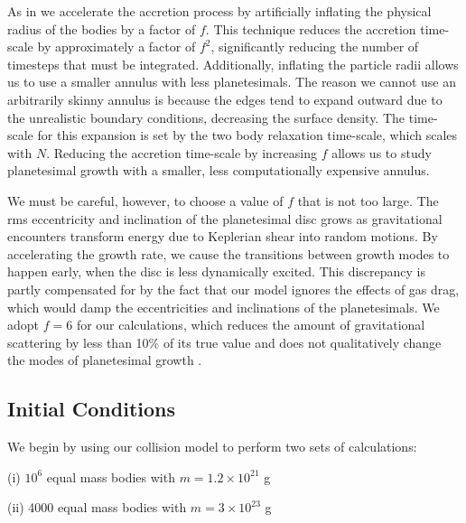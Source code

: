 As in \cite{kokubo96, kokubo98} we accelerate the accretion process by artificially inflating the physical radius of the bodies by 
a factor of $f$. This technique reduces the accretion time-scale by approximately a factor of $f^{2}$, significantly reducing the 
number of timesteps that must be integrated. Additionally, inflating the particle radii allows us to use a smaller annulus with less 
planetesimals. The reason we cannot use an arbitrarily skinny annulus is because the edges tend to expand outward due to the 
unrealistic boundary conditions, decreasing the surface density. The time-scale for this expansion is set by the two body 
relaxation time-scale, which scales with $N$. Reducing the accretion time-scale by increasing $f$ allows us to study 
planetesimal growth with a smaller, less computationally expensive annulus.

We must be careful, however, to choose a value of $f$ that is not too large. The rms eccentricity and inclination of the 
planetesimal disc grows as gravitational encounters transform energy due to Keplerian shear into random motions. By 
accelerating the growth rate, we cause the transitions between growth modes to happen early, when the disc is less dynamically 
excited. This discrepancy is partly compensated for by the fact that our model ignores the effects of gas drag, which would damp 
the eccentricities and inclinations of the planetesimals. We adopt $f=6$ for our calculations, which reduces the amount of 
gravitational scattering by less than 10\% of its true value and does not qualitatively change the modes of planetesimal growth 
\cite{kokubo98}.

\subsection{Initial Conditions} \label{sec:ics}

We begin by using our collision model to perform two sets of calculations:

(i) $10^{6}$ equal mass bodies with $m = 1.2 \times 10^{21}$ g

(ii) 4000 equal mass bodies with $m = 3 \times 10^{23}$ g

